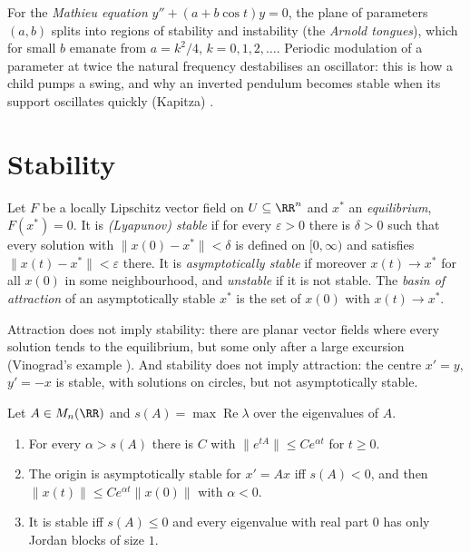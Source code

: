 For the \emph{Mathieu equation} $y'' + (a + b\cos t)y = 0$, the plane of parameters $(a, b)$ splits into regions of stability and instability (the \emph{Arnold tongues}), which for small $b$ emanate from $a = k^2/4$, $k = 0, 1, 2, \ldots$.
Periodic modulation of a parameter at twice the natural frequency destabilises an oscillator: this is how a child pumps a swing, and why an inverted pendulum becomes stable when its support oscillates quickly (Kapitza)
\cite{arnold-mechanics}.

\section{Stability}\label{ordinary-differential-equations:section-stability}

\begin{definition}\label{ordinary-differential-equations:definition-stability}
Let $F$ be a locally Lipschitz vector field on $U \subseteq \RR^n$ and $x^*$ an \emph{equilibrium}, $F(x^*) = 0$. It is \emph{(Lyapunov) stable} if for every $\varepsilon > 0$ there is $\delta > 0$ such that every solution with
$\|x(0) - x^*\| < \delta$ is defined on $[0, \infty)$ and satisfies $\|x(t) - x^*\| < \varepsilon$ there. It is \emph{asymptotically stable} if moreover $x(t) \to x^*$ for all $x(0)$ in some neighbourhood, and \emph{unstable} if it is not stable.
The \emph{basin of attraction} of an asymptotically stable $x^*$ is the set of $x(0)$ with $x(t) \to x^*$.
\end{definition}

\begin{counterexample}\label{ordinary-differential-equations:counterexample-attracting-unstable}
Attraction does not imply stability: there are planar vector fields where every solution tends to the equilibrium, but some only after a large excursion (Vinograd's example \cite{hahn-stability}). And stability does not imply
attraction: the centre $x' = y$, $y' = -x$ is stable, with solutions on circles, but not asymptotically stable.
\end{counterexample}

\begin{theorem}\label{ordinary-differential-equations:theorem-linear-stability}
Let $A \in M_n(\RR)$ and $s(A) = \max\operatorname{Re}\lambda$ over the eigenvalues of $A$.
\begin{enumerate}
\item For every $\alpha > s(A)$ there is $C$ with $\|e^{tA}\| \leq Ce^{\alpha t}$ for $t \geq 0$.
\item The origin is asymptotically stable for $x' = Ax$ iff $s(A) < 0$, and then $\|x(t)\| \leq Ce^{\alpha t}\|x(0)\|$ with $\alpha < 0$.
\item It is stable iff $s(A) \leq 0$ and every eigenvalue with real part $0$ has only Jordan blocks of size $1$.
\end{enumerate}
\end{theorem}

